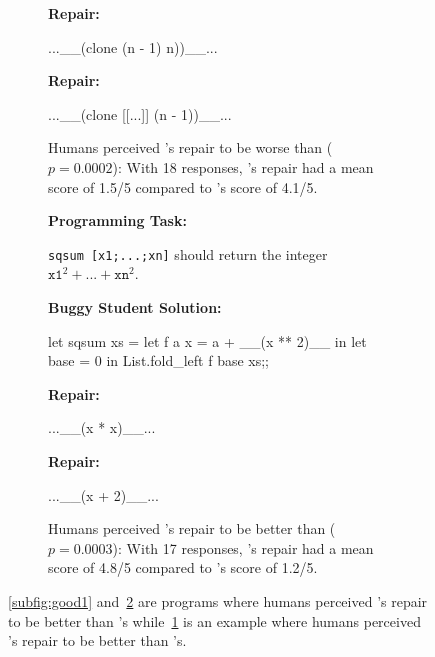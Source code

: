 \begin{figure}
\begin{subfigure}[t]{.28\textwidth}
\begin{center}
\textbf{\toolname Repair:}
\end{center}
\begin{compactcode}
 ...__(clone (n - 1) n))__...
\end{compactcode}
\begin{center}
\textbf{\seminal Repair:}
\end{center}
\begin{compactcode}
...__(clone [[...]] (n - 1))__...
\end{compactcode}
\caption{Humans perceived \toolname's repair to be
worse than \seminal ($p=0.0002$): With 18 responses, \toolname's
repair had a mean score of 1.5/5 compared to \seminal's
score of 4.1/5.}
\label{subfig:bad}
\end{subfigure}\hfill
\begin{subfigure}[t]{.1\textwidth}
\end{subfigure}\hfill
\begin{subfigure}[t]{.28\textwidth}
\begin{center}
\textbf{Programming Task:}
\end{center}
\texttt{sqsum [x1;...;xn]} should return the
integer $\texttt{x1}^2 + ... + \texttt{xn}^2$.
\begin{center}
\textbf{Buggy Student Solution:}
\end{center}
\begin{compactcode}
let sqsum xs =
let f a x = a + __(x ** 2)__ in
let base = 0 in
List.fold_left f base xs;;
\end{compactcode}
\begin{center}
\textbf{\toolname Repair:}
\end{center}
\begin{compactcode}
       ...__(x * x)__...
\end{compactcode}
\begin{center}
\textbf{\seminal Repair:}
\end{center}
\begin{compactcode}
      ...__(x + 2)__...
\end{compactcode}
\caption{Humans perceived \toolname's repair to be
better than \seminal ($p=0.0003$): With 17 responses, \toolname's
repair had a mean score of 4.8/5 compared to \seminal's
score of 1.2/5.}
\label{subfig:good2}
\end{subfigure}
\caption{\ref{subfig:good1} and~\ref{subfig:good2} are programs where
humans perceived \toolname's repair to be better than \seminal's while~\ref{subfig:bad}
is an example where humans perceived \seminal's repair to be better than \toolname's.}
\label{fig:examples}
\end{figure}

